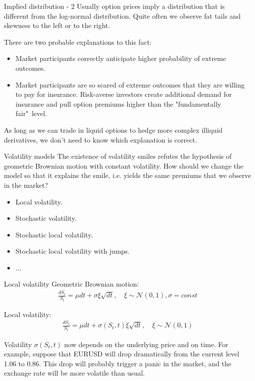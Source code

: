 \documentclass{beamer}
\begin{document}
\begin{frame}{Implied distribution - 2}
\justify
Usually option prices imply a distribution that is different from the log-normal distribution. Quite often we observe fat tails and skewness to the left or to the right.

\justify
There are two probable explanations to this fact:
\begin{itemize}
\item Market participants correctly anticipate higher probability of extreme outcomes.
\item Market participants are so scared of extreme outcomes that they are willing to pay for insurance. Risk-averse investors create additional demand for insurance and pull option premiums higher than the "fundamentally fair"\ level.
\end{itemize}

\justify
As long as we can trade in liquid options to hedge more complex illiquid derivatives, we don't need to know which explanation is correct.
\end{frame}



\begin{frame}{Volatility models}
\justify
The existence of volatility smiles refutes the hypothesis of geometric Brownian motion with constant volatility. How should we change the model so that it explains the smile, i.e. yields the same premiums that we observe in the market?

\justify
\begin{itemize}
\item Local volatility.
\item Stochastic volatility.
\item Stochastic local volatility.
\item Stochastic local volatility with jumps.
\item ...
\end{itemize}
\end{frame}



\begin{frame}{Local volatility}
\justify
Geometric Brownian motion:
\begin{align*}
\frac{dS_t}{S_t} = \mu dt + \sigma\xi\sqrt{dt}, \quad \xi \sim \mathcal{N}(0, 1), \sigma = const
\end{align*}

\justify
Local volatility:
\begin{align*}
\frac{dS_t}{S_t} = \mu dt + \sigma(S_t, t)\xi\sqrt{dt}, \quad \xi \sim \mathcal{N}(0, 1)
\end{align*}

\justify
Volatility $\sigma(S_t, t)$ now depends on the underlying price and on time. For example, suppose that EURUSD will drop dramatically from the current level 1.06 to 0.86. This drop will probably trigger a panic in the market, and the exchange rate will be more volatile than usual.
\end{frame}
\end{document}
